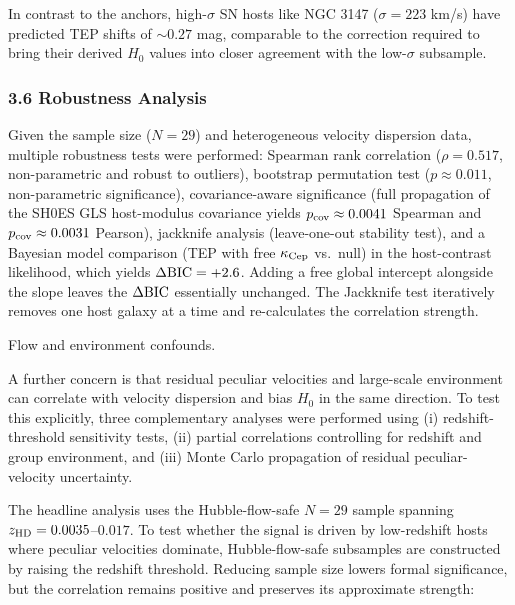 \documentclass[
]{article}
\begin{document}
In contrast to the anchors, high-\(\sigma\) SN hosts like NGC 3147
(\(\sigma =
223\) km/s) have predicted TEP shifts of \(\sim 0.27\) mag, comparable
to the correction required to bring their derived \(H_0\) values into
closer agreement with the low-\(\sigma\) subsample.

\subsubsection{3.6 Robustness Analysis}\label{robustness-analysis}

Given the sample size (\(N=29\)) and heterogeneous velocity dispersion
data, multiple robustness tests were performed: Spearman rank
correlation (\(\rho =
0.517\), non-parametric and robust to outliers), bootstrap permutation
test (\(p \approx 0.011\), non-parametric significance),
covariance-aware significance (full propagation of the SH0ES GLS
host-modulus covariance yields \(p_{\rm cov} \approx 0.0041\) Spearman
and \(p_{\rm cov} \approx 0.0031\) Pearson), jackknife analysis
(leave-one-out stability test), and a Bayesian model comparison (TEP
with free \(\kappa_{\rm Cep}\) vs.~null) in the host-contrast
likelihood, which yields \(\Delta{\rm BIC} = +2.6\). Adding a free
global intercept alongside the slope leaves the \(\Delta{\rm BIC}\)
essentially unchanged. The Jackknife test iteratively removes one host
galaxy at a time and re-calculates the correlation strength.

Flow and environment confounds.

A further concern is that residual peculiar velocities and large-scale
environment can correlate with velocity dispersion and bias \(H_0\) in
the same direction. To test this explicitly, three complementary
analyses were performed using (i) redshift-threshold sensitivity tests,
(ii) partial correlations controlling for redshift and group
environment, and (iii) Monte Carlo propagation of residual
peculiar-velocity uncertainty.

The headline analysis uses the Hubble-flow-safe \(N=29\) sample spanning
\(z_{\rm HD}=0.0035\)--\(0.017\). To test whether the signal is driven
by low-redshift hosts where peculiar velocities dominate,
Hubble-flow-safe subsamples are constructed by raising the redshift
threshold. Reducing sample size lowers formal significance, but the
correlation remains positive and preserves its approximate strength:
\end{document}
